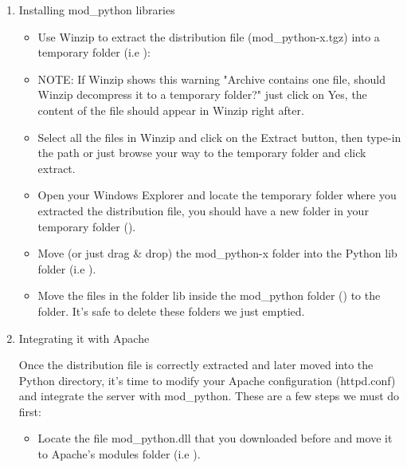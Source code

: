 \begin{enumerate}

\item
Installing mod_python libraries

\begin{itemize}

\item
Use Winzip to extract the distribution file (mod_python-x.tgz) into a
temporary folder (i.e ):

\item
NOTE: If Winzip shows this warning "Archive contains one file, should
Winzip decompress it to a temporary folder?" just click on Yes, the
content of the file should appear in Winzip right after.

\item
Select all the files in Winzip and click on the Extract button, then
type-in the path or just browse your way to the temporary folder and
click extract.

\item       
Open your Windows Explorer and locate the temporary folder where you
extracted the distribution file, you should have a new folder in your
temporary folder ().

\item            
Move (or just drag \& drop) the mod_python-x folder into the Python lib
folder (i.e ).

\item            
Move the files in the folder lib inside the mod_python folder
() to the
 folder. It's safe to delete
these folders we just emptied.

\end{itemize}

\item
Integrating it with Apache

      
Once the distribution file is correctly extracted and later moved into
the Python directory, it's time to modify your Apache configuration
(httpd.conf) and integrate the server with mod_python. These are a few
steps we must do first:

\begin{itemize}

\item            
Locate the file mod_python.dll that you downloaded before and move it
to Apache's modules folder (i.e ).
            

\end{itemize}
\end{enumerate}
